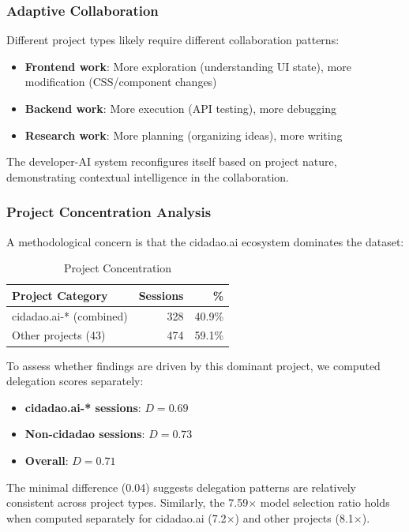 \subsubsection{Adaptive Collaboration}

Different project types likely require different collaboration patterns:
\begin{itemize}
    \item \textbf{Frontend work}: More exploration (understanding UI state), more modification (CSS/component changes)
    \item \textbf{Backend work}: More execution (API testing), more debugging
    \item \textbf{Research work}: More planning (organizing ideas), more writing
\end{itemize}

The developer-AI system reconfigures itself based on project nature, demonstrating contextual intelligence in the collaboration.

\subsubsection{Project Concentration Analysis}

A methodological concern is that the cidadao.ai ecosystem dominates the dataset:

\begin{table}[h]
\caption{Project Concentration}
\label{tab:concentration}
\begin{tabular}{lrr}
\toprule
\textbf{Project Category} & \textbf{Sessions} & \textbf{\%} \\
\midrule
cidadao.ai-* (combined) & 328 & 40.9\% \\
Other projects (43) & 474 & 59.1\% \\
\bottomrule
\end{tabular}
\end{table}

To assess whether findings are driven by this dominant project, we computed delegation scores separately:

\begin{itemize}
    \item \textbf{cidadao.ai-* sessions}: $D = 0.69$
    \item \textbf{Non-cidadao sessions}: $D = 0.73$
    \item \textbf{Overall}: $D = 0.71$
\end{itemize}

The minimal difference (0.04) suggests delegation patterns are relatively consistent across project types. Similarly, the 7.59$\times$ model selection ratio holds when computed separately for cidadao.ai (7.2$\times$) and other projects (8.1$\times$).

